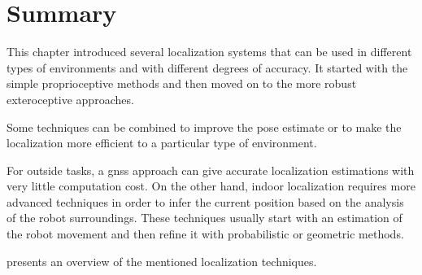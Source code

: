 \section{Summary}

This chapter introduced several localization systems that can be used in different types of environments and with different degrees of accuracy. It started with the simple proprioceptive methods and then moved on to the more robust exteroceptive approaches.

Some techniques can be combined to improve the pose estimate or to make the localization more efficient to a particular type of environment.

For outside tasks, a \gls{gnss} approach can give accurate localization estimations with very little computation cost. On the other hand, indoor localization requires more advanced techniques in order to infer the current position based on the analysis of the robot surroundings. These techniques usually start with an estimation of the robot movement and then refine it with probabilistic or geometric methods.

 presents an overview of the mentioned localization techniques.


